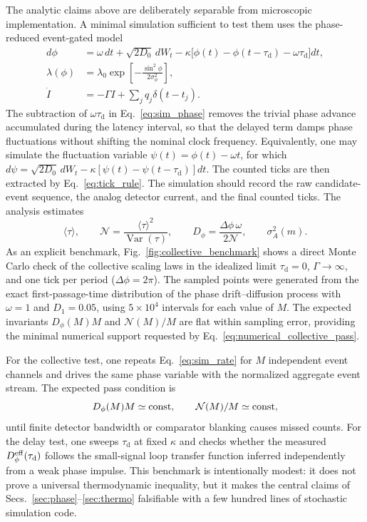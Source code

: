 \documentclass[aps,pre,reprint,amsmath,amssymb,floatfix,nofootinbib]{revtex4-2}
\newcommand{\avg}[1]{\langle #1 \rangle}
\newcommand{\Dphi}{D_{\phi}}
\newcommand{\taud}{\tau_{\mathrm{d}}}
\begin{document}
The analytic claims above are deliberately separable from microscopic
implementation. A minimal simulation sufficient to test them uses the
phase-reduced event-gated model
\begin{align}
  d\phi &= \omega\,dt + \sqrt{2D_0}\,dW_t
  -\kappa\big[\phi(t)-\phi(t-\taud)-\omega\taud\big]dt,
  \label{eq:sim_phase}\\
  \lambda(\phi) &= \lambda_0
  \exp\!\left[-\frac{\sin^2\phi}{2\sigma_\phi^2}\right],
  \label{eq:sim_rate}\\
  \dot I &= -\Gamma I+\sum_j q_j\delta(t-t_j).
  \label{eq:sim_detector}
\end{align}
The subtraction of $\omega\taud$ in Eq.~\eqref{eq:sim_phase} removes the
trivial phase advance accumulated during the latency interval, so that the
delayed term damps phase fluctuations without shifting the nominal clock
frequency. Equivalently, one may simulate the fluctuation variable
$\psi(t)=\phi(t)-\omega t$, for which
$ d\psi=\sqrt{2D_0}\,dW_t-\kappa[\psi(t)-\psi(t-\taud)]dt$.
The counted ticks are then extracted by Eq.~\eqref{eq:tick_rule}. The
simulation should record the raw candidate-event sequence, the analog
detector current, and the final counted ticks. The analysis estimates
\begin{equation}
  \avg{\tau},
  \qquad
  \mathcal{N}=\frac{\avg{\tau}^2}{\operatorname{Var}(\tau)},
  \qquad
  D_\phi=\frac{\Delta\phi\,\omega}{2\mathcal{N}},
  \qquad
  \sigma_A^2(m).
  \label{eq:numerical_observables}
\end{equation}
As an explicit benchmark, Fig.~\ref{fig:collective_benchmark} shows a
direct Monte Carlo check of the collective scaling laws in the idealized
limit $\taud=0$, $\Gamma\to\infty$, and one tick per period
($\Delta\phi=2\pi$). The sampled points were generated from the exact
first-passage-time distribution of the phase drift--diffusion process with
$\omega=1$ and $D_1=0.05$, using $5\times 10^4$ intervals for each value of
$M$. The expected invariants $\Dphi(M)M$ and $\mathcal{N}(M)/M$ are flat
within sampling error, providing the minimal numerical support requested by
Eq.~\eqref{eq:numerical_collective_pass}.

For the collective test, one repeats Eq.~\eqref{eq:sim_rate} for
$M$ independent event channels and drives the same phase variable with
the normalized aggregate event stream. The expected pass condition is
\begin{equation}
  D_\phi(M)M \simeq {\rm const},
  \qquad
  \mathcal{N}(M)/M \simeq {\rm const},
  \label{eq:numerical_collective_pass}
\end{equation}
until finite detector bandwidth or comparator blanking causes missed
counts. For the delay test, one sweeps $\taud$ at fixed $\kappa$ and
checks whether the measured $D_\phi^{\rm eff}(\taud)$ follows the
small-signal loop transfer function inferred independently from a weak
phase impulse. This benchmark is intentionally modest: it does not prove
a universal thermodynamic inequality, but it makes the central claims of
Secs.~\ref{sec:phase}--\ref{sec:thermo} falsifiable with a few hundred
lines of stochastic simulation code.
\end{document}
